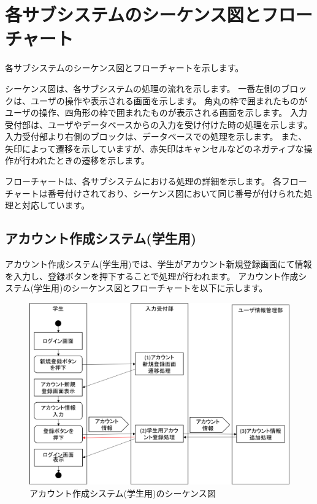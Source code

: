 \section{各サブシステムのシーケンス図とフローチャート}
各サブシステムのシーケンス図とフローチャートを示します。

シーケンス図は、各サブシステムの処理の流れを示します。
一番左側のブロックは、ユーザの操作や表示される画面を示します。
角丸の枠で囲まれたものがユーザの操作、四角形の枠で囲まれたものが表示される画面を示します。
入力受付部は、ユーザやデータベースからの入力を受け付けた時の処理を示します。
入力受付部より右側のブロックは、データベースでの処理を示します。
また、矢印によって遷移を示していますが、赤矢印はキャンセルなどのネガティブな操作が行われたときの遷移を示します。

フローチャートは、各サブシステムにおける処理の詳細を示します。
各フローチャートは番号付けされており、シーケンス図において同じ番号が付けられた処理と対応しています。
\clearpage
\subsection{アカウント作成システム(学生用)}
アカウント作成システム(学生用)では、学生がアカウント新規登録画面にて情報を入力し、登録ボタンを押下することで処理が行われます。
アカウント作成システム(学生用)のシーケンス図とフローチャートを以下に示します。

\begin{figure}[htbp]
  \begin{center}
    \includegraphics[width=1\linewidth,clip]{./img/seq1}
    \caption{アカウント作成システム(学生用)のシーケンス図}\label{fig:seq1}
  \end{center}
\end{figure}

